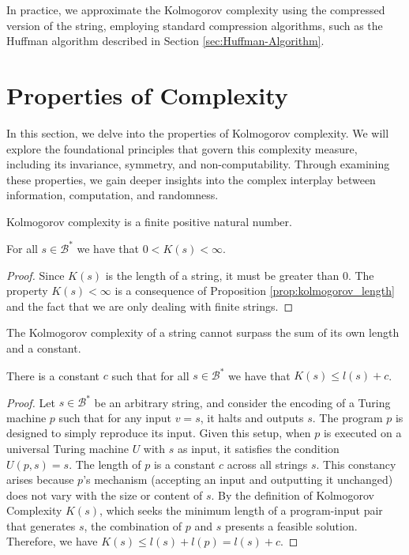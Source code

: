 In practice, we approximate the Kolmogorov complexity using the compressed version of the string, employing standard compression algorithms, such as the Huffman algorithm described in Section \ref{sec:Huffman-Algorithm}.

%
%

\section{Properties of Complexity}

In this section, we delve into the properties of Kolmogorov complexity. We will explore the foundational principles that govern this complexity measure, including its invariance, symmetry, and non-computability. Through examining these properties, we gain deeper insights into the complex interplay between information, computation, and randomness.

Kolmogorov complexity is a finite positive natural number.

\begin{proposition}
For all $s\in\mathcal{B}^{\ast}$ we have that $0 < K(s) < \infty$.
\end{proposition}
\begin{proof}
Since $K(s)$ is the length of a string, it must be greater than $0$. The property $K(s) < \infty$ is a consequence of Proposition \ref{prop:kolmogorov_length} and the fact that we are only dealing with finite strings.
\end{proof}

The Kolmogorov complexity of a string cannot surpass the sum of its own length and a constant.

\begin{proposition}
\label{prop:kolmogorov_length}
There is a constant $c$ such that for all $s\in\mathcal{B}^{\ast}$ we have that $K(s) \leq l(s) + c$.
\end{proposition}
\begin{proof}
Let $s \in \mathcal{B}^\ast$ be an arbitrary string, and consider the encoding of a Turing machine $p$ such that for any input $v = s$, it halts and outputs $s$. The program $p$ is designed to simply reproduce its input. Given this setup, when $p$ is executed on a universal Turing machine $U$ with $s$ as input, it satisfies the condition $U(p, s) = s$. The length of \(p\) is a constant $c$ across all strings $s$. This constancy arises because $p$'s mechanism (accepting an input and outputting it unchanged) does not vary with the size or content of $s$. By the definition of Kolmogorov Complexity $K(s)$, which seeks the minimum length of a program-input pair that generates $s$, the combination of $p$ and $s$ presents a feasible solution. Therefore, we have $K(s) \leq l(s) + l(p) = l(s) + c$.
\end{proof}

